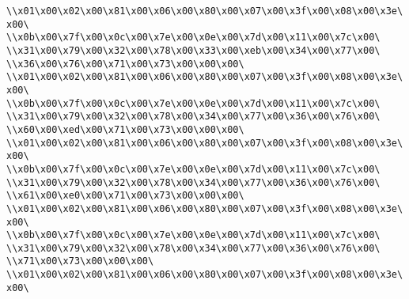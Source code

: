 \verb|\\x01\x00\x02\x00\x81\x00\x06\x00\x80\x00\x07\x00\x3f\x00\x08\x00\x3e\x00\|\newline
\verb|\\x0b\x00\x7f\x00\x0c\x00\x7e\x00\x0e\x00\x7d\x00\x11\x00\x7c\x00\|\newline
\verb|\\x31\x00\x79\x00\x32\x00\x78\x00\x33\x00\xeb\x00\x34\x00\x77\x00\|\newline
\verb|\\x36\x00\x76\x00\x71\x00\x73\x00\x00\x00\|\newline
\verb|\\x01\x00\x02\x00\x81\x00\x06\x00\x80\x00\x07\x00\x3f\x00\x08\x00\x3e\x00\|\newline
\verb|\\x0b\x00\x7f\x00\x0c\x00\x7e\x00\x0e\x00\x7d\x00\x11\x00\x7c\x00\|\newline
\verb|\\x31\x00\x79\x00\x32\x00\x78\x00\x34\x00\x77\x00\x36\x00\x76\x00\|\newline
\verb|\\x60\x00\xed\x00\x71\x00\x73\x00\x00\x00\|\newline
\verb|\\x01\x00\x02\x00\x81\x00\x06\x00\x80\x00\x07\x00\x3f\x00\x08\x00\x3e\x00\|\newline
\verb|\\x0b\x00\x7f\x00\x0c\x00\x7e\x00\x0e\x00\x7d\x00\x11\x00\x7c\x00\|\newline
\verb|\\x31\x00\x79\x00\x32\x00\x78\x00\x34\x00\x77\x00\x36\x00\x76\x00\|\newline
\verb|\\x61\x00\xe0\x00\x71\x00\x73\x00\x00\x00\|\newline
\verb|\\x01\x00\x02\x00\x81\x00\x06\x00\x80\x00\x07\x00\x3f\x00\x08\x00\x3e\x00\|\newline
\verb|\\x0b\x00\x7f\x00\x0c\x00\x7e\x00\x0e\x00\x7d\x00\x11\x00\x7c\x00\|\newline
\verb|\\x31\x00\x79\x00\x32\x00\x78\x00\x34\x00\x77\x00\x36\x00\x76\x00\|\newline
\verb|\\x71\x00\x73\x00\x00\x00\|\newline
\verb|\\x01\x00\x02\x00\x81\x00\x06\x00\x80\x00\x07\x00\x3f\x00\x08\x00\x3e\x00\|\newline
